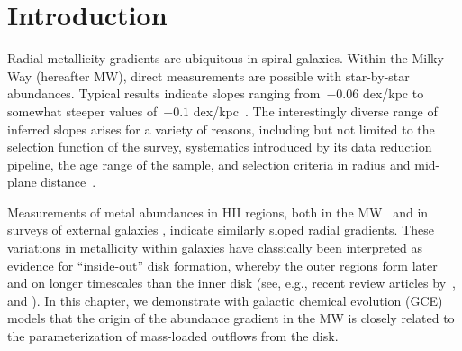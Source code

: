 \section{Introduction}
\label{outflows:sec:intro}
\noindent
Radial metallicity gradients are ubiquitous in spiral galaxies.
Within the Milky Way (hereafter MW), direct measurements are possible with
star-by-star abundances.
Typical results indicate slopes ranging from~$-0.06$ dex/kpc to somewhat
steeper values of~$-0.1$ dex/kpc~\citep[e.g.,][]{Nordstroem2004, Cheng2012,
Frinchaboy2013, Hayden2014, Weinberg2019, Myers2022}.
The interestingly diverse range of inferred slopes arises for a variety of
reasons, including but not limited to the selection function of the survey,
systematics introduced by its data reduction pipeline, the age range of the
sample, and selection criteria in radius and mid-plane
distance~\citep[see discussion in, e.g.,~\S~5 of][]{Anders2017}.
\par
Measurements of metal abundances in HII regions, both in the
MW~\citep[e.g.,][]{Simpson1995, Afflerbach1997, Esteban2022, MendezDelgado2022,
MendezDelgado2023} and in surveys of external galaxies
\citep[e.g.,][]{Belfiore2017, Berg2020, Franchetto2021, Boardman2022}, indicate
similarly sloped radial gradients.
These variations in metallicity within galaxies have classically been
interpreted as evidence for ``inside-out'' disk formation, whereby the outer
regions form later and on longer timescales than the inner disk (see, e.g.,
recent review articles by~\citealt{Kewley2019, Maiolino2019}, and
\citealt{Sanchez2020}).
In this chapter, we demonstrate with galactic chemical evolution (GCE) models
that the origin of the abundance gradient in the MW is closely related to the
parameterization of mass-loaded outflows from the disk.




